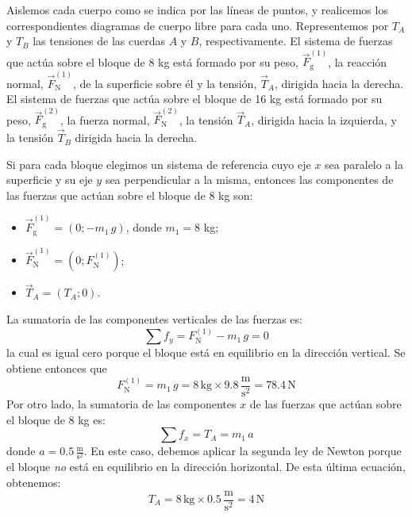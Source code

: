 \documentclass[addpoints]{exam}
\begin{document}
\begin{questions}
    \begin{solution}
        Aislemos cada cuerpo como se indica por las líneas de puntos, y realicemos los correspondientes diagramas de cuerpo libre para cada uno. Representemos por $T_A$ y $T_B$ las tensiones de las cuerdas $A$ y $B$, respectivamente. El sistema de fuerzas que actúa sobre el bloque de 8 kg está formado por su peso, $\vec{F}_\text{g}^{(1)}$, la reacción normal, $\vec{F}_{\text{N}}^{(1)}$, de la superficie sobre él y la tensión, $\vec{T}_A$, dirigida hacia la derecha. El sistema de fuerzas que actúa sobre el bloque de 16 kg está formado por su peso, $\vec{F}_\text{g}^{(2)}$, la fuerza normal, $\vec{F}_{\text{N}}^{(2)}$, la tensión $\vec{T}_A$, dirigida hacia la izquierda, y la tensión $\vec{T}_B$ dirigida hacia la derecha. 
        
        Si para cada bloque elegimos un sistema de referencia cuyo eje $x$ sea paralelo a la superficie y su eje $y$ sea perpendicular a la misma, entonces las componentes de las fuerzas que actúan sobre el bloque de 8 kg son:
        \begin{itemize}
            \item $\vec{F}_\text{g}^{(1)} = \left(0; - m_1 \, g\right)$, donde $m_1 = 8$ kg;
            \item $\vec{F}_{\text{N}}^{(1)} = \left(0;F_{\text{N}}^{(1)}\right)$;
            \item $\vec{T}_A = \left(T_A; 0\right)$.
        \end{itemize}
        La sumatoria de las componentes verticales de las fuerzas es: $$\sum f_y = F_{\text{N}}^{(1)} - m_1 \, g = 0$$ la cual es igual cero porque el bloque está en equilibrio en la dirección vertical. Se obtiene entonces que $$ F_{\text{N}}^{(1)} = m_1 \, g = 8 \, \text{kg} \times 9.8 \, \frac{\text{m}}{\text{s}^2} = 78.4 \, \text{N}$$ Por otro lado, la sumatoria de las componentes $x$ de las fuerzas que actúan sobre el bloque de 8 kg es: $$\sum f_x = T_A = m_1 \, a$$ donde $a = 0.5 \, \frac{\text{m}}{\text{s}^2}$. En este caso, debemos aplicar la segunda ley de Newton porque el bloque \emph{no} está en equilibrio en la dirección horizontal. De esta última ecuación, obtenemos: $$T_A = 8 \, \text{kg} \times 0.5 \, \frac{\text{m}}{\text{s}^2} = 4 \, \text{N}$$


\end{solution}
\end{questions}
\end{document}

